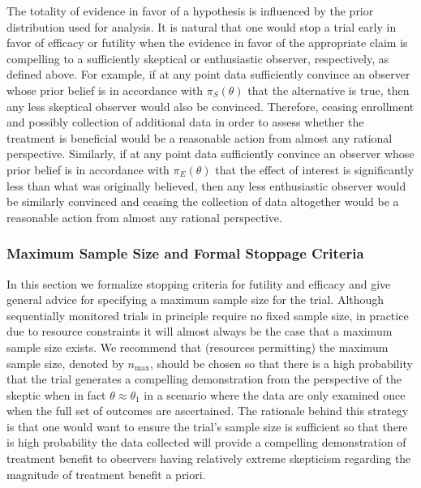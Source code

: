 \documentclass[12pt]{article}
\begin{document}
The totality of evidence in favor of a hypothesis is influenced by 
the prior distribution used for analysis.
%
It is natural that one would stop a trial early in favor of efficacy or futility when the evidence in favor of the appropriate claim is compelling
to a sufficiently skeptical or enthusiastic observer, respectively, as defined above.
%
For example, if at any point data sufficiently convince an observer whose prior belief is in accordance with $\pi_{S}(\theta)$ that 
the alternative is true, then any less skeptical observer would also be convinced. Therefore, ceasing enrollment and possibly collection 
of additional data in order to assess whether the treatment is beneficial would be a reasonable action from almost any rational perspective.
%
Similarly, if at any point data sufficiently convince an observer whose prior belief is in accordance with $\pi_{E}(\theta)$ that 
the effect of interest is significantly less than what was originally believed, then any less enthusiastic observer would be similarly convinced and ceasing the collection of data altogether would be a reasonable action from almost any rational perspective.

\subsubsection{Maximum Sample Size and Formal Stoppage Criteria}
In this section we formalize stopping criteria for futility and efficacy and give general 
advice for specifying a maximum sample size for the trial.
%
Although sequentially monitored trials in principle require no fixed sample size, in practice due to resource 
constraints it will almost always be the case that a maximum sample size exists. 
%
We recommend that (resources permitting) the maximum sample size, denoted by $n_{\text{max}}$, should be chosen so that there is a 
high probability that the trial generates a compelling demonstration from the perspective of the skeptic when in 
fact $\theta \approx \theta_1$ in a scenario where the data are only examined once when the full set of 
outcomes are ascertained.
%
The rationale behind this strategy is that one would want to ensure the trial's sample size is sufficient so that
there is high probability the data collected will provide a compelling demonstration of treatment benefit to observers 
having relatively extreme skepticism regarding the magnitude of treatment benefit a priori.  
\end{document}
